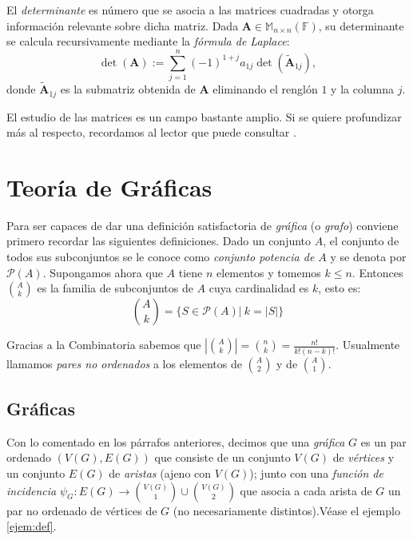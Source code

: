             El \textit{determinante}  es número que se asocia a las matrices cuadradas y otorga información relevante sobre dicha matriz. Dada $\mathbf{A} \in \mathbb{M}_{n \times n} (\mathbb{F})$, su determinante se calcula recursivamente mediante la \textit{fórmula de Laplace}:
            $$
            \det(\mathbf{A}):= \sum_{j=1}^{n} (-1)^{1+j} a_{1j} \det(\widetilde{\mathbf{A}}_{1j}),
            $$ donde $\widetilde{\mathbf{A}}_{1j}$ es la submatriz obtenida de $\mathbf{A}$ eliminando el renglón $1$ y la columna $j$.
            
            El estudio de las matrices es un campo bastante amplio. Si se quiere profundizar más al respecto, recordamos al lector que puede consultar  \cite{Friedberg,Noble,Zhang, Shores}.

        \section{Teoría de Gráficas}

        Para ser capaces de dar una definición satisfactoria de \textit{gráfica} (o \textit{grafo}) conviene primero recordar las siguientes definiciones. Dado un conjunto $A$, el conjunto de todos sus subconjuntos se le conoce como \textit{conjunto potencia de $A$} y se denota por $\mathcal{P}(A)$. Supongamos ahora que $A$ tiene $n$ elementos y tomemos $k \leq n$. Entonces $\binom{A}{k}$ es la familia de subconjuntos de $A$ cuya cardinalidad es $k$, esto es:
        $$ \binom{A}{k} = \Big\{ S \in \mathcal{P}(A) \Big| \: k = |S| \Big\} $$
        
        Gracias a la Combinatoria sabemos que $\left | \binom{A}{k} \right | = \binom{n}{k} = \frac{n!}{k! (n -k)!}$. Usualmente llamamos \textit{pares no ordenados} a los elementos de $\binom{A}{2}$ y de $\binom{A}{1}$.

        \subsection{Gráficas} \label{sec:queesunagrafica}

            Con lo comentado en los párrafos anteriores, decimos que una \textit{gráfica}  $G$ es un par ordenado $(V(G), E(G))$ que consiste de un conjunto $V(G)$ de \textit{vértices}  y un conjunto $E(G)$ de \textit{aristas} (ajeno con $V(G)$); junto con una \textit{función de incidencia} $\psi_{G} \colon E(G) \rightarrow \binom{V(G)}{1} \cup \binom{V(G)}{2}$ que asocia a cada arista de $G$ un par no ordenado de vértices de $G$ (no necesariamente distintos).Véase el ejemplo \ref{ejem:def}.

